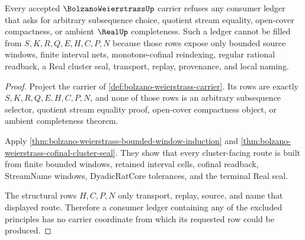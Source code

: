\begin{theorem}
\label{thm:bolzano-weierstrass-ledger-refusal}
Every accepted $\BolzanoWeierstrassUp$ carrier refuses any consumer ledger that asks for arbitrary subsequence choice, quotient stream equality, open-cover compactness, or ambient $\RealUp$ completeness. Such a ledger cannot be filled from $S,K,R,Q,E,H,C,P,N$ because those rows expose only bounded source windows, finite interval nets, monotone-cofinal reindexing, regular rational readback, a Real cluster seal, transport, replay, provenance, and local naming.
\end{theorem}
\begin{proof}
Project the carrier of \autoref{def:bolzano-weierstrass-carrier}. Its rows are exactly $S,K,R,Q,E,H,C,P,N$, and none of those rows is an arbitrary subsequence selector, quotient stream equality proof, open-cover compactness object, or ambient completeness theorem.

Apply \autoref{thm:bolzano-weierstrass-bounded-window-induction} and \autoref{thm:bolzano-weierstrass-cofinal-cluster-seal}. They show that every cluster-facing route is built from finite bounded windows, retained interval cells, cofinal readback, StreamName windows, DyadicRatCore tolerances, and the terminal Real seal.

The structural rows $H,C,P,N$ only transport, replay, source, and name that displayed route. Therefore a consumer ledger containing any of the excluded principles has no carrier coordinate from which its requested row could be produced.
\end{proof}

